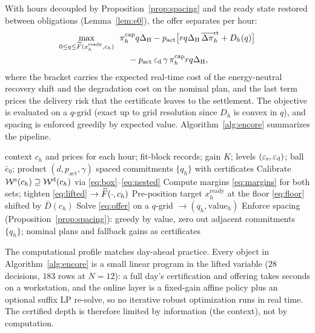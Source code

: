 With hours decoupled by Proposition~\ref{prop:spacing} and the ready state
restored between obligations (Lemma~\ref{lem:e0}), the offer separates per
hour:
\begin{equation}
\begin{aligned}
\max_{0\le q\le \widetilde{F}(x^{\mathrm{ready}}_h, c_h)}\ \
&\pi^{\mathrm{cap}}_h q \Delta_{\mathrm{H}} - p_{\mathrm{act}}\bigl[r q \Delta_{\mathrm{H}}\,
\overline{\Delta\pi}^{\mathrm{rt}}_h + D_h(q)\bigr]\\
&\quad - p_{\mathrm{act}}\,\varepsilon_{\mathrm{d}}\,\gamma\,\pi^{\mathrm{cap}}_h r q \Delta_{\mathrm{H}},
\end{aligned}
\label{eq:offer}
\end{equation}
where the bracket carries the expected real-time cost of the energy-neutral
recovery shift and the degradation cost on the nominal plan, and the last
term prices the delivery risk that the certificate leaves to the settlement.
The objective is evaluated on a $q$-grid (exact up to grid resolution since
$D_h$ is convex in $q$), and spacing is enforced greedily by expected value.
Algorithm~\ref{alg:encore} summarizes the pipeline.

\begin{algorithm}[t]
\small
\caption{ENCORE Day-Ahead Certification and Offering}
\label{alg:encore}
\begin{algorithmic}[1]
\renewcommand{\algorithmicrequire}{\textbf{Input:}}
\renewcommand{\algorithmicensure}{\textbf{Output:}}
\REQUIRE context $c_h$ and prices for each hour; fit-block records; gain $K$;
levels $(\varepsilon_{\mathrm{s}},\varepsilon_{\mathrm{d}})$; ball $\bar e_0$; product $(d, p_{\mathrm{act}},
\gamma)$
\ENSURE spaced commitments $\{q_h\}$ with certificates
\STATE Calibrate $\mathcal{W}^{\mathrm{s}}(c_h)\supseteq\mathcal{W}^{\mathrm{d}}(c_h)$ via \eqref{eq:box}--\eqref{eq:nested}
\STATE Compute margins \eqref{eq:margins} for both sets; tighten
\eqref{eq:lifted} $\to \widetilde{F}(\cdot,c_h)$
\STATE Pre-position target $x^{\mathrm{ready}}_h$ at the floor
\eqref{eq:floor} shifted by $\bar D(c_h)$
\STATE Solve \eqref{eq:offer} on a $q$-grid $\to (q_h, \text{value}_h)$
\ENDFOR
\STATE Enforce spacing (Proposition~\ref{prop:spacing}): greedy by value,
zero out adjacent commitments
\RETURN $\{q_h\}$; nominal plans and fallback gains as certificates
\end{algorithmic}
\end{algorithm}

The computational profile matches day-ahead practice. Every object in
Algorithm~\ref{alg:encore} is a small linear program in the lifted variable
($28$ decisions, $183$ rows at $N=12$): a full day's certification and
offering takes seconds on a workstation, and the online layer is a
fixed-gain affine policy plus an optional suffix LP re-solve, so no
iterative robust optimization runs in real time. The certified depth is
therefore limited by information (the context), not by computation.

\vspace{-2mm}
